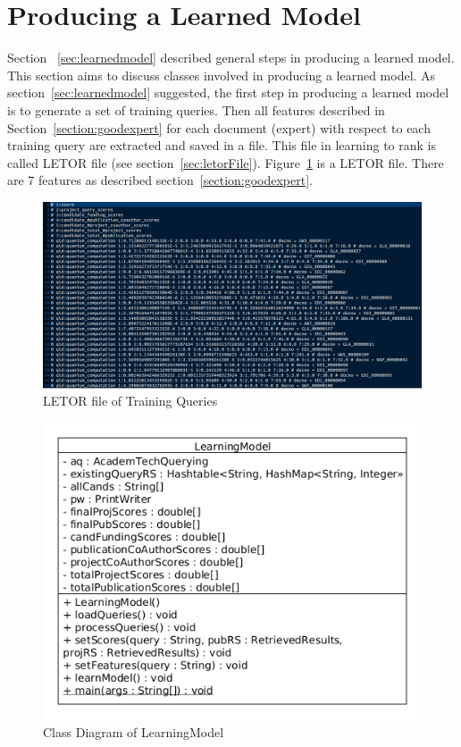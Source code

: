 \section{Producing a Learned Model}\label{section:producelearnedmodel}
Section ~\ref{sec:learnedmodel} described general steps in producing a learned model. This section aims to discuss classes involved in producing a learned model.
As section~\ref{sec:learnedmodel} suggested, the first step in producing a learned model is to generate a set of training queries. 
Then all features described in Section~\ref{section:goodexpert} for each document (expert) with respect to each training query are extracted and saved
in a file. This file in learning to rank is called LETOR file (see section~\ref{sec:letorFile}).
Figure~\ref{fig:sampleletorfile} is a LETOR file. There are 7 features as described section~\ref{section:goodexpert}.

\begin{figure}
\centering
\includegraphics[scale=0.3]{./figures/sampleletorfile.png}
\caption{LETOR file of Training Queries} \label{fig:sampleletorfile} 
\end{figure}

\begin{figure}
\centering
\includegraphics[scale=0.7]{./figures/learningModel.png}
\caption{Class Diagram of LearningModel} \label{fig:learningmodel} 
\end{figure}

